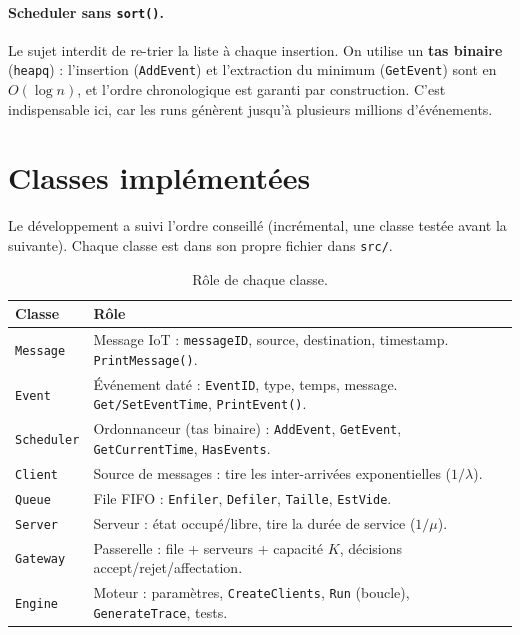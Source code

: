 \documentclass[11pt,a4paper]{article}
\begin{document}
\paragraph{Scheduler sans \texttt{sort()}.} Le sujet interdit de re-trier la liste à
chaque insertion. On utilise un \textbf{tas binaire} (\texttt{heapq}) : l'insertion
(\texttt{AddEvent}) et l'extraction du minimum (\texttt{GetEvent}) sont en
$O(\log n)$, et l'ordre chronologique est garanti par construction. C'est
indispensable ici, car les runs génèrent jusqu'à plusieurs millions
d'événements.

\section{Classes implémentées}
Le développement a suivi l'ordre conseillé (incrémental, une classe testée avant
la suivante). Chaque classe est dans son propre fichier dans \texttt{src/}.

\begin{table}[h]
\centering
\small
\begin{tabular}{@{}lp{11.2cm}@{}}
\toprule
\textbf{Classe} & \textbf{Rôle} \\
\midrule
\texttt{Message}   & Message IoT : \texttt{messageID}, source, destination, timestamp. \texttt{PrintMessage()}. \\
\texttt{Event}     & Événement daté : \texttt{EventID}, type, temps, message. \texttt{Get/SetEventTime}, \texttt{PrintEvent()}. \\
\texttt{Scheduler} & Ordonnanceur (tas binaire) : \texttt{AddEvent}, \texttt{GetEvent}, \texttt{GetCurrentTime}, \texttt{HasEvents}. \\
\texttt{Client}    & Source de messages : tire les inter-arrivées exponentielles ($1/\lambda$). \\
\texttt{Queue}     & File FIFO : \texttt{Enfiler}, \texttt{Defiler}, \texttt{Taille}, \texttt{EstVide}. \\
\texttt{Server}    & Serveur : état occupé/libre, tire la durée de service ($1/\mu$). \\
\texttt{Gateway}   & Passerelle : file + serveurs + capacité $K$, décisions accept/rejet/affectation. \\
\texttt{Engine}    & Moteur : paramètres, \texttt{CreateClients}, \texttt{Run} (boucle), \texttt{GenerateTrace}, tests. \\
\bottomrule
\end{tabular}
\caption{Rôle de chaque classe.}
\end{table}
\end{document}
